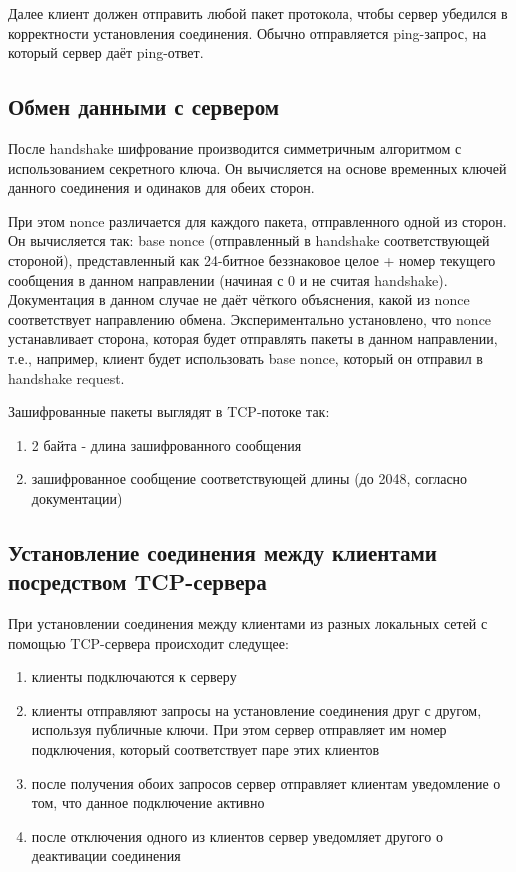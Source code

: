 \documentclass{/home/fresheed/utils/latex/university-templates/lab-report}
\begin{document}
Далее клиент должен отправить любой пакет протокола, чтобы сервер убедился в корректности установления соединения. Обычно отправляется ping-запрос, на который сервер даёт ping-ответ.

\subsection{Обмен данными с сервером}

После handshake шифрование производится симметричным алгоритмом с использованием секретного ключа. Он вычисляется на основе временных ключей данного соединения и одинаков для обеих сторон.

При этом nonce различается для каждого пакета, отправленного одной из сторон. Он вычисляется так: base nonce (отправленный в handshake соответствующей стороной), представленный как 24-битное беззнаковое целое + номер текущего сообщения в данном направлении (начиная с 0 и не считая handshake). Документация в данном случае не даёт чёткого объяснения, какой из nonce соответствует направлению обмена. Экспериментально установлено, что nonce устанавливает сторона, которая будет отправлять пакеты в данном направлении, т.е., например, клиент будет использовать base nonce, который он отправил в handshake request. 

Зашифрованные пакеты выглядят в TCP-потоке так:

\begin{enumerate}
\item 2 байта - длина зашифрованного сообщения
\item зашифрованное сообщение соответствующей длины (до 2048, согласно документации)
\end{enumerate}


\subsection{Установление соединения между клиентами посредством TCP-сервера}

При установлении соединения между клиентами из разных локальных сетей с помощью TCP-сервера происходит следущее:

\begin{enumerate}
\item клиенты подключаются к серверу
\item клиенты отправляют запросы на установление соединения друг с другом, используя публичные ключи. При этом сервер отправляет им номер подключения, который соответствует паре этих клиентов
\item после получения обоих запросов сервер отправляет клиентам уведомление о том, что данное подключение активно
\item после отключения одного из клиентов сервер уведомляет другого о деактивации соединения
\end{enumerate}
\end{document}
